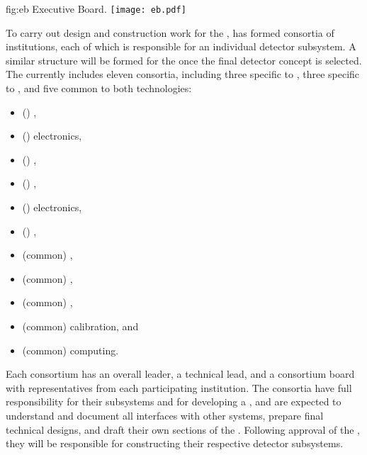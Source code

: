 \begin{dunefigure}	
{fig:eb}{ Executive Board.}
\texttt{[image: eb.pdf]}
\end{dunefigure}

To carry out design and construction work for the  ,  has  formed consortia of institutions, each of which is responsible for an individual detector subsystem. A similar structure will be formed for the  once the final detector concept is selected. The  currently includes eleven consortia, including three specific to , three specific to , and five common to both technologies:
\begin{itemize}
\item (\single) , %
\item (\single)  electronics, %
\item (\single) , %
\item (\dual) , %
\item (\dual)  electronics, %
\item (\dual) , %
\item (common) , %
\item (common) ,  %
\item (common) , %
\item (common) calibration,  and %
\item (common) computing.
\end{itemize} 
 Each consortium has an overall leader, a technical lead, and a consortium board with representatives from each participating institution. The consortia have full responsibility for their subsystems and for developing a , and are expected to understand and document all interfaces with other systems, prepare final technical designs, and draft their own sections of the . Following approval of the  , they will be responsible for constructing their respective detector subsystems. %

